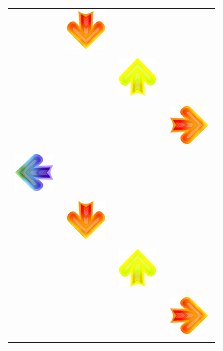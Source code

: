 \begin{center}
\begin{table}[ht]
\begin{minipage}{.5\linewidth}
\begin{tabular}[b]{cccc}
				  & \includegraphics[width=1cm]{figures/032/down.png}       
				  &                                                         
				  &                                                         
				\\
				[-20pt]
				  &                                                         
				  & \includegraphics[width=1cm]{figures/016/up.png}         
				  &                                                         
				\\
				[-20pt]
				  &                                                         
				  &                                                         
				  & \includegraphics[width=1cm]{figures/032/right.png}      
				\\
				[-20pt]
				\includegraphics[width=1cm]{figures/008/left.png}
				  &                                                         
				  &                                                         
				  &                                                         
				\\
				[-20pt]
				
				  & \includegraphics[width=1cm]{figures/032/down.png}       
				  &                                                         
				  &                                                         
				\\
				[-20pt]
				  &                                                         
				  & \includegraphics[width=1cm]{figures/016/up.png}         
				  &                                                         
				\\
				[-20pt]
				  &                                                         
				  &                                                         
				  & \includegraphics[width=1cm]{figures/032/right.png}      
				                    

\end{tabular}
\end{minipage}
\end{table}
\end{center}
